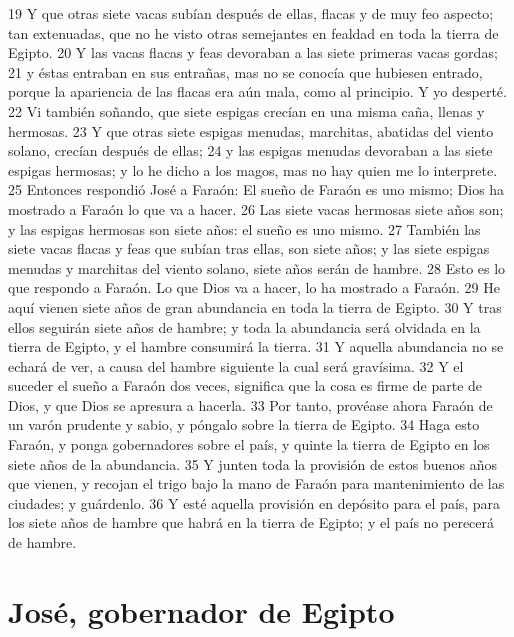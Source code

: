 19 Y que otras siete vacas subían después de ellas, flacas y de muy feo aspecto; tan extenuadas, que no he visto otras semejantes en fealdad en toda la tierra de Egipto.
20 Y las vacas flacas y feas devoraban a las siete primeras vacas gordas;
21 y éstas entraban en sus entrañas, mas no se conocía que hubiesen entrado, porque la apariencia de las flacas era aún mala, como al principio. Y yo desperté.
22 Vi también soñando, que siete espigas crecían en una misma caña, llenas y hermosas.
23 Y que otras siete espigas menudas, marchitas, abatidas del viento solano, crecían después de ellas;
24 y las espigas menudas devoraban a las siete espigas hermosas; y lo he dicho a los magos, mas no hay quien me lo interprete.
25 Entonces respondió José a Faraón: El sueño de Faraón es uno mismo; Dios ha mostrado a Faraón lo que va a hacer.
26 Las siete vacas hermosas siete años son; y las espigas hermosas son siete años: el sueño es uno mismo.
27 También las siete vacas flacas y feas que subían tras ellas, son siete años; y las siete espigas menudas y marchitas del viento solano, siete años serán de hambre.
28 Esto es lo que respondo a Faraón. Lo que Dios va a hacer, lo ha mostrado a Faraón.
29 He aquí vienen siete años de gran abundancia en toda la tierra de Egipto.
30 Y tras ellos seguirán siete años de hambre; y toda la abundancia será olvidada en la tierra de Egipto, y el hambre consumirá la tierra.
31 Y aquella abundancia no se echará de ver, a causa del hambre siguiente la cual será gravísima.
32 Y el suceder el sueño a Faraón dos veces, significa que la cosa es firme de parte de Dios, y que Dios se apresura a hacerla.
33 Por tanto, provéase ahora Faraón de un varón prudente y sabio, y póngalo sobre la tierra de Egipto.
34 Haga esto Faraón, y ponga gobernadores sobre el país, y quinte la tierra de Egipto en los siete años de la abundancia.
35 Y junten toda la provisión de estos buenos años que vienen, y recojan el trigo bajo la mano de Faraón para mantenimiento de las ciudades; y guárdenlo.
36 Y esté aquella provisión en depósito para el país, para los siete años de hambre que habrá en la tierra de Egipto; y el país no perecerá de hambre.

\section{José, gobernador de Egipto}

